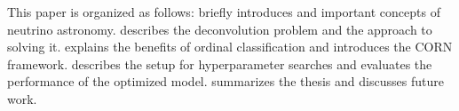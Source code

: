 This paper is organized as follows:
 briefly introduces \icecube{} and important concepts of neutrino astronomy.
 describes the deconvolution problem and the \dsea{} approach to solving it.
 explains the benefits of ordinal classification and introduces the \ac{CORN} framework.
 describes the setup for hyperparameter searches and evaluates the performance of the optimized model.
 summarizes the thesis and discusses future work.
